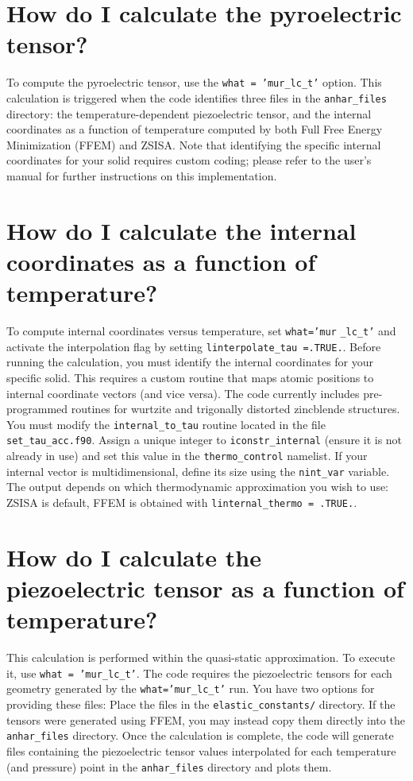 \documentclass[12pt,a4paper,twoside]{report}
\begin{document}
\newpage

{\color{coral}\section{How do I calculate the pyroelectric tensor?}}
\color{black}
To compute the pyroelectric tensor, use the \texttt{what = 'mur\_lc\_t'} 
option. This calculation is triggered when the code identifies three 
files in the \texttt{anhar\_files} directory: the temperature-dependent 
piezoelectric tensor, and the internal coordinates as a function of 
temperature computed by both Full Free Energy Minimization (FFEM) and 
ZSISA. Note that identifying the specific internal coordinates for your 
solid requires custom coding; please refer to the user's manual for 
further instructions on this implementation.

\newpage

{\color{coral}\section{How do I calculate the internal coordinates as
a function of temperature?}}
\color{black}

To compute internal coordinates versus temperature, set 
\texttt{what='mur} \texttt{\_lc\_t'} and activate the interpolation flag 
by setting \texttt{linterpolate\_tau =.TRUE.}.
Before running the calculation, you must identify the internal 
coordinates for your specific solid. This requires a custom routine 
that maps atomic positions to internal coordinate vectors (and vice versa).
The code currently includes pre-programmed routines for wurtzite and 
trigonally distorted zincblende structures. You must modify the 
\texttt{internal\_to\_tau} routine located in the file 
\texttt{set\_tau\_acc.f90}.
Assign a unique integer to \texttt{iconstr\_internal} 
(ensure it is not already in use) and set this value in the 
\texttt{thermo\_control} namelist. If your internal vector is 
multidimensional, define its size using the \texttt{nint\_var} variable.
The output depends on which thermodynamic approximation you wish to use:
ZSISA is default, FFEM is obtained with \texttt{linternal\_thermo = .TRUE.}.

\newpage

{\color{coral}\section{How do I calculate the piezoelectric tensor as 
a function of temperature?}}
\color{black}
This calculation is performed within the quasi-static approximation. 
To execute it, use \texttt{what = 'mur\_lc\_t'}. 
The code requires the piezoelectric tensors for each geometry generated 
by the \texttt{what='mur\_lc\_t'} run. You have two options for 
providing these files: Place the files in the \texttt{elastic\_constants/} 
directory. If the tensors were generated using FFEM, you may instead copy 
them directly into the \texttt{anhar\_files} directory.
Once the calculation is complete, the code will generate files containing 
the piezoelectric tensor values interpolated for each temperature 
(and pressure) point in the \texttt{anhar\_files} directory and plots them.
\end{document}
